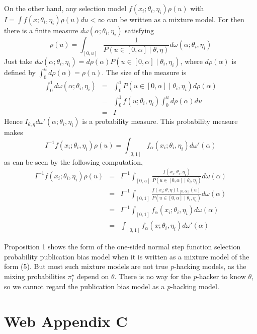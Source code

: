 \documentclass[english]{article}
\begin{document}
On the other hand, any selection model $f(x_{i};\theta_{i},\eta_{i})\rho(u)$ with $I =\int f(x;\theta_{i},\eta_{i})\rho(u)du<\infty$ can be written as a mixture model. For then there is a finite measure $d\omega(\alpha;\theta_{i},\eta_{i})$ satisfying 
\[
\rho(u)=\int_{[0,u]}\frac{1}{P(u\in\left[0,\alpha\right]\mid\theta,\eta)}d\omega(\alpha;\theta_{i},\eta_{i})
\]
Just take $d\omega(\alpha;\theta_{i},\eta_{i})=d\rho(\alpha)P(u\in\left[0,\alpha\right]\mid\theta_{i},\eta_{i})$, where $d\rho(\alpha)$ is defined by $\int_{0}^{u}d\rho(\alpha)=\rho(u)$. The size of the measure is
\begin{eqnarray*}
\int_{0}^{1}d\omega(\alpha;\theta_{i},\eta_{i}) & = & \int_{0}^{1}P(u\in\left[0,\alpha\right]\mid\theta_{i},\eta_{i})d\rho(\alpha)\\
 & = & \int_{0}^{1}f(u;\theta_{i},\eta_{i})\int_{0}^{u}d\rho(\alpha)du\\
 & = & I
\end{eqnarray*}
Hence $I_{\theta,\eta}d\omega'(\alpha;\theta_{i},\eta_{i})$ is a probability measure. This probability measure makes 
\[
I^{-1}f(x_{i};\theta_{i},\eta_{i})\rho(u)=\int_{[0,1]}f_\alpha(x_{i};\theta_{i},\eta_{i})d\omega'(\alpha)
\]
as can be seen by the following computation,
\begin{eqnarray*}
I^{-1}f(x_{i};\theta_{i},\eta_{i})\rho(u) & = & I^{-1}\int_{[0,u]}\frac{f(x_{i};\theta_{i},\eta_{i})}{P(u\in\left[0,\alpha\right]\mid\theta_{i},\eta_{i})}d\omega(\alpha)\\
 & = & I^{-1}\int_{[0,1]}\frac{f(x_{i};\theta,\eta)1_{\left[0,\alpha\right]}(u)}{P(u\in\left[0,\alpha\right]\mid\theta_{i},\eta_{i})}d\omega(\alpha)\\
 & = & I^{-1}\int_{[0,1]}f_\alpha(x_{i};\theta_{i},\eta_{i})d\omega(\alpha)\\
 & = & \int_{[0,1]}f_\alpha(x;\theta_{i},\eta_{i})d\omega'(\alpha)
\end{eqnarray*}

Proposition 1 shows the form of the one-sided normal step function selection probability publication bias model when it is written as a mixture model of the form (5). But most such mixture models are not true \textit{p}-hacking models, as the mixing probabilities $\pi_{i}^{\star}$ depend on $\theta$. There is no way for the \textit{p}-hacker to know
$\theta$, so we cannot regard the publication bias model as a \textit{p}-hacking model.




\section*{Web Appendix C}
\end{document}
